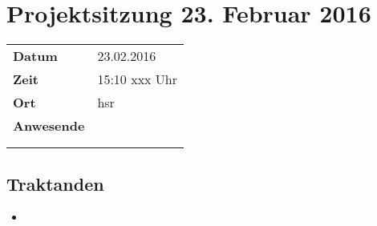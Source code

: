 \documentclass[class=scrbook,crop=false]{standalone}
\begin{document}
	
	\section{Projektsitzung 23. Februar 2016}

	\xxx
	
	\begin{tabular}{ll}
		\textbf{Datum} & 23.02.2016 \\
		\textbf{Zeit} & 15:10 \textendash xxx Uhr \\
		\textbf{Ort} & \acs{hsr} \\
		\textbf{Anwesende} & \proff \\ & \ubos \\ & \pchr
	\end{tabular}
	
	\subsection*{Traktanden}
	\begin{itemize}
		\item \xxx
	\end{itemize}
\end{document}
